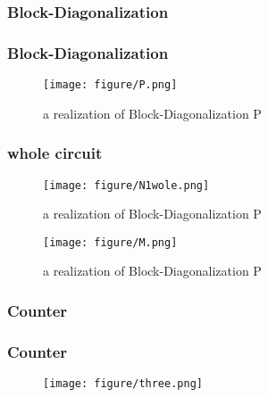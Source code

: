 \documentclass[aspectratio=1610]{beamer}
\begin{document}
\subsubsection{Block-Diagonalization}
\begin{frame}
\frametitle{Block-Diagonalization}
\begin{figure}
  \texttt{[image: figure/P.png]}
  \caption{a realization of Block-Diagonalization P}
\end{figure}
\end{frame}
\begin{frame}
  \frametitle{whole circuit}
  \begin{figure}
    \texttt{[image: figure/N1wole.png]}
    \caption{a realization of Block-Diagonalization P}
  \end{figure}
  \begin{figure}
    \texttt{[image: figure/M.png]}
    \caption{a realization of Block-Diagonalization P}
  \end{figure}
\end{frame}
\subsubsection{Counter}
\begin{frame}
\frametitle{Counter}
  \begin{figure}
    \texttt{[image: figure/three.png]}
  \end{figure}

\end{frame}

\end{document}
